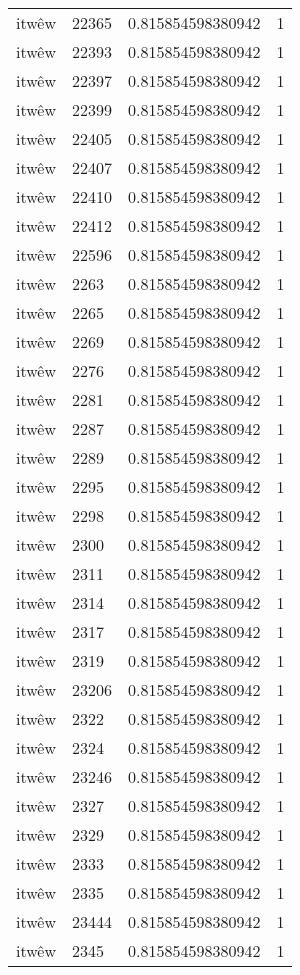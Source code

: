 \begin{longtable}{llll}
itwêw & 22365 & 0.815854598380942 & 1 \\
itwêw & 22393 & 0.815854598380942 & 1 \\
itwêw & 22397 & 0.815854598380942 & 1 \\
itwêw & 22399 & 0.815854598380942 & 1 \\
itwêw & 22405 & 0.815854598380942 & 1 \\
itwêw & 22407 & 0.815854598380942 & 1 \\
itwêw & 22410 & 0.815854598380942 & 1 \\
itwêw & 22412 & 0.815854598380942 & 1 \\
itwêw & 22596 & 0.815854598380942 & 1 \\
itwêw & 2263 & 0.815854598380942 & 1 \\
itwêw & 2265 & 0.815854598380942 & 1 \\
itwêw & 2269 & 0.815854598380942 & 1 \\
itwêw & 2276 & 0.815854598380942 & 1 \\
itwêw & 2281 & 0.815854598380942 & 1 \\
itwêw & 2287 & 0.815854598380942 & 1 \\
itwêw & 2289 & 0.815854598380942 & 1 \\
itwêw & 2295 & 0.815854598380942 & 1 \\
itwêw & 2298 & 0.815854598380942 & 1 \\
itwêw & 2300 & 0.815854598380942 & 1 \\
itwêw & 2311 & 0.815854598380942 & 1 \\
itwêw & 2314 & 0.815854598380942 & 1 \\
itwêw & 2317 & 0.815854598380942 & 1 \\
itwêw & 2319 & 0.815854598380942 & 1 \\
itwêw & 23206 & 0.815854598380942 & 1 \\
itwêw & 2322 & 0.815854598380942 & 1 \\
itwêw & 2324 & 0.815854598380942 & 1 \\
itwêw & 23246 & 0.815854598380942 & 1 \\
itwêw & 2327 & 0.815854598380942 & 1 \\
itwêw & 2329 & 0.815854598380942 & 1 \\
itwêw & 2333 & 0.815854598380942 & 1 \\
itwêw & 2335 & 0.815854598380942 & 1 \\
itwêw & 23444 & 0.815854598380942 & 1 \\
itwêw & 2345 & 0.815854598380942 & 1 \\

\end{longtable}
